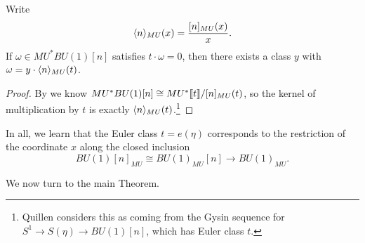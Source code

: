 \begin{corollary}\label{QuillensGysinFact}
Write \[\langle n\rangle_{MU}(x) = \frac{[n]_{MU}(x)}{x}.\]  If \(\omega \in MU^* BU(1)[n]\) satisfies \(t \cdot \omega = 0\), then there exists a class \(y\) with \(\omega = y \cdot \langle n\rangle_{MU}(t)\).
\end{corollary}
\begin{proof}
By  we know \(MU^* BU(1)[n] \cong MU^*\llbracket{t}\rrbracket / [n]_{MU}(t)\), so the kernel of multiplication by \(t\) is exactly \(\langle n\rangle_{MU}(t)\).\footnote{Quillen considers this as coming from the Gysin sequence for \(S^1 \to S(\eta) \to BU(1)[n]\), which has Euler class \(t\).}
\end{proof}

\noindent In all, we learn that the Euler class \(t = e(\eta)\) corresponds to the restriction of the coordinate \(x\) along the closed inclusion \[BU(1)[n]_{MU} \cong BU(1)_{MU}[n] \to BU(1)_{MU}.\]

We now turn to the main Theorem.

